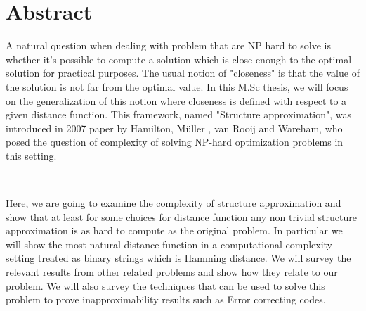 \doublespacing
\setlength{\topmargin}{-.5in}
\chapter*{Abstract}





A natural question when dealing with problem that are NP hard to solve is whether it's possible to compute a solution which is close enough to the optimal solution for practical purposes. The usual notion of "closeness" is that the value of the solution is not far from the optimal value. In this M.Sc thesis, we will focus on the generalization of this notion where closeness is defined with respect to a given distance function. This framework, named "Structure approximation", was introduced in 2007 paper by Hamilton, M{\"u}ller , van Rooij and Wareham, who posed the question of complexity of solving NP-hard optimization problems in this setting.


\
 
Here, we are going to examine the complexity of structure approximation and show that at least for some choices for distance function any non trivial structure approximation is as hard to compute as the original problem. In particular we will show the most natural distance function in a computational complexity setting treated as binary strings which is Hamming distance. We will survey the relevant results from other related problems and show how they relate to our problem. We will also survey the techniques that can be used to solve this problem to prove inapproximability results such as Error correcting codes. 


